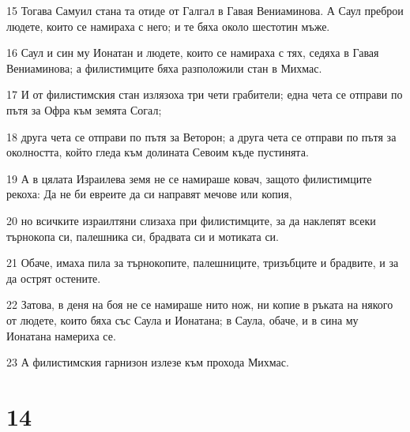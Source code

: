 \par 15 Тогава Самуил стана та отиде от Галгал в Гавая Вениаминова. А Саул преброи людете, които се намираха с него; и те бяха около шестотин мъже.
\par 16 Саул и син му Ионатан и людете, които се намираха с тях, седяха в Гавая Вениаминова; а филистимците бяха разположили стан в Михмас.
\par 17 И от филистимския стан излязоха три чети грабители; една чета се отправи по пътя за Офра към земята Согал;
\par 18 друга чета се отправи по пътя за Веторон; а друга чета се отправи по пътя за околността, който гледа към долината Севоим къде пустинята.
\par 19 А в цялата Израилева земя не се намираше ковач, защото филистимците рекоха: Да не би евреите да си направят мечове или копия,
\par 20 но всичките израилтяни слизаха при филистимците, за да наклепят всеки търнокопа си, палешника си, брадвата си и мотиката си.
\par 21 Обаче, имаха пила за търнокопите, палешниците, тризъбците и брадвите, и за да острят остените.
\par 22 Затова, в деня на боя не се намираше нито нож, ни копие в ръката на някого от людете, които бяха със Саула и Ионатана; в Саула, обаче, и в сина му Ионатана намериха се.
\par 23 А филистимския гарнизон излезе към прохода Михмас.

\chapter{14}

